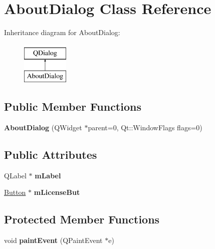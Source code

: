 \hypertarget{class_about_dialog}{\section{About\-Dialog Class Reference}
\label{class_about_dialog}
}
Inheritance diagram for About\-Dialog\-:\begin{figure}[H]
\begin{center}
\leavevmode
\includegraphics[height=2.000000cm]{class_about_dialog}
\end{center}
\end{figure}
\subsection*{Public Member Functions}
\begin{DoxyCompactItemize}
\item 
\hypertarget{class_about_dialog_a5cb38e09ec03404147de505a82a0a4d6}{{\bfseries About\-Dialog} (Q\-Widget $\ast$parent=0, Qt\-::\-Window\-Flags flags=0)}\label{class_about_dialog_a5cb38e09ec03404147de505a82a0a4d6}

\end{DoxyCompactItemize}
\subsection*{Public Attributes}
\begin{DoxyCompactItemize}
\item 
\hypertarget{class_about_dialog_a3028ec15658f3c3d68dcd7420ec9ad6b}{Q\-Label $\ast$ {\bfseries m\-Label}}\label{class_about_dialog_a3028ec15658f3c3d68dcd7420ec9ad6b}

\item 
\hypertarget{class_about_dialog_ab3461ec2cd6777ea4ce0c478e14fcee5}{\hyperlink{class_button}{Button} $\ast$ {\bfseries m\-License\-But}}\label{class_about_dialog_ab3461ec2cd6777ea4ce0c478e14fcee5}

\end{DoxyCompactItemize}
\subsection*{Protected Member Functions}
\begin{DoxyCompactItemize}
\item 
\hypertarget{class_about_dialog_af0b0765f8a1c9e36b44a5efd52d8ea05}{void {\bfseries paint\-Event} (Q\-Paint\-Event $\ast$e)}\label{class_about_dialog_af0b0765f8a1c9e36b44a5efd52d8ea05}

\end{DoxyCompactItemize}


